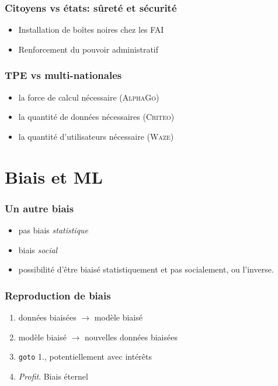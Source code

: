 \documentclass[10pt]{beamer}
\begin{document}
\begin{frame}
  \frametitle{Citoyens vs états: sûreté et sécurité}


  \begin{itemize}[<+->]
  \item Installation de boîtes noires chez les FAI
  \item Renforcement du pouvoir administratif
  \end{itemize}

\end{frame}

\begin{frame}
  \frametitle{TPE vs multi-nationales}


  \begin{itemize}[<+->]
  \item la force de calcul nécessaire (\textsc{AlphaGo})
  \item la quantité de données nécessaires (\textsc{Criteo})
  \item la quantité d'utilisateurs nécessaire (\textsc{Waze})
  \end{itemize}

\end{frame}

\section{Biais et ML}
\label{sec:biais-et-ml}

\begin{frame}
  \frametitle{Un autre biais}


  \begin{itemize}[<+->]
  \item pas biais \emph{statistique}
  \item biais \emph{social}
  \item possibilité d'être biaisé statistiquement et pas socialement, ou l'inverse.
  \end{itemize}
\end{frame}

\begin{frame}
  \frametitle{Reproduction de biais}


  \begin{enumerate}[<+->]
  \item données biaisées $\rightarrow$ modèle biaisé
  \item modèle biaisé $\rightarrow$ nouvelles données biaisées
  \item \texttt{goto} 1., potentiellement avec intérêts
  \item \emph{Profit}. Biais éternel
  \end{enumerate}
\end{frame}
\end{document}

